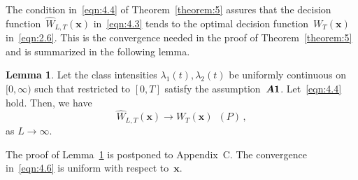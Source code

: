 \documentclass[lettersize,journal,onecolumn]{IEEEtran}
\theoremstyle{definition}
\newtheorem{lemma}{Lemma}
\newcommand{\assumption}[1]{{\rm \boldsymbol{A#1}}}
\begin{document}
The condition in~\eqref{eqn:4.4} of Theorem~\ref{theorem:5} assures that the decision 
function~$\widehat{W}_{L,T}(\mathbf{x})$ in~\eqref{eqn:4.3} tends to the optimal 
decision function~$W_{T}(\mathbf{x})$ in~\eqref{eqn:2.6}. This is the convergence
needed in the proof of Theorem~\ref{theorem:5} and is summarized in the following lemma.
\begin{lemma}
	\label{lemma:7}
	Let the class intensities $\lambda_{1}(t),\lambda_{2}(t)$ be uniformly continuous 
	on~$[0,\infty)$ such that restricted to $[0,T]$ satisfy 
	the assumption~$\assumption{1}$. Let~\eqref{eqn:4.4} hold. Then, we have
	\begin{equation}
		\widehat{W}_{L,T}(\mathbf{x}) \to W_{T}(\mathbf{x})
		\enspace (P)
		\label{eqn:4.6}\,,
	\end{equation}
	as $L\to\infty$. 
\end{lemma}
The proof of Lemma~\ref{lemma:7} is postponed to Appendix~C.
The convergence in~\eqref{eqn:4.6} is uniform with respect to~$\mathbf{x}$.
\end{document}
